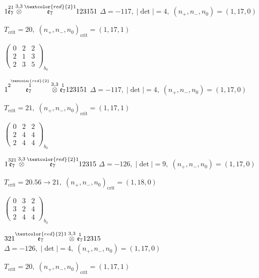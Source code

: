 \documentclass[10pt]{article}
\begin{document}
$1\overset{21}{\mathfrak{e}_7}\overset{3,3}{\otimes}\overset{\textcolor{red}{2}1}{\mathfrak{e}_7}123151$ \quad $\Delta=-117,\; |\det|=4,\; (n_+,n_-,n_0)=(1,17,0)$

\hspace{1em}$T_{\text{crit}}=20,\; (n_+,n_-,n_0)_{\text{crit}}=(1,17,1)$

\hspace{2em}$\left(\begin{smallmatrix}0 & 2 & 2 \\ 2 & 1 & 3 \\ 2 & 3 & 5\end{smallmatrix}\right)_{\!b_0}$

$1\overset{2\overset{\textcolor{red}{2}}{1}}{\mathfrak{e}_7}\overset{3,3}{\otimes}\overset{1}{\mathfrak{e}_7}123151$ \quad $\Delta=-117,\; |\det|=4,\; (n_+,n_-,n_0)=(1,17,0)$

\hspace{1em}$T_{\text{crit}}=21,\; (n_+,n_-,n_0)_{\text{crit}}=(1,17,1)$

\hspace{2em}$\left(\begin{smallmatrix}0 & 2 & 2 \\ 2 & 4 & 4 \\ 2 & 4 & 4\end{smallmatrix}\right)_{\!b_0}$

\smallskip

$1\overset{321}{\mathfrak{e}_7}\overset{3,3}{\otimes}\overset{\textcolor{red}{2}1}{\mathfrak{e}_7}12315$ \quad $\Delta=-126,\; |\det|=9,\; (n_+,n_-,n_0)=(1,17,0)$

\hspace{1em}$T_{\text{crit}}=20.56 \to 21,\; (n_+,n_-,n_0)_{\text{crit}}=(1,18,0)$

\hspace{2em}$\left(\begin{smallmatrix}0 & 3 & 2 \\ 3 & 2 & 4 \\ 2 & 4 & 4\end{smallmatrix}\right)_{\!b_0}$

$321\overset{\textcolor{red}{2}1}{\mathfrak{e}_7}\overset{3,3}{\otimes}\overset{1}{\mathfrak{e}_7}12315$ \quad $\Delta=-126,\; |\det|=4,\; (n_+,n_-,n_0)=(1,17,0)$

\hspace{1em}$T_{\text{crit}}=20,\; (n_+,n_-,n_0)_{\text{crit}}=(1,17,1)$
\end{document}
